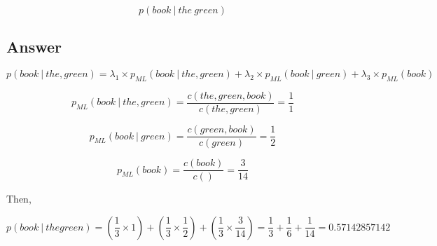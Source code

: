 \documentclass{article}
\newcommand\given[1][]{\:#1\vert\:}
\begin{document}
\begin{equation*}
p(book\given the\ green)
\end{equation*}

\subsection*{Answer}


\begin{equation*}
p(book \given the, green) = \lambda_1 \times p_{ML}(book \given the, green ) + \lambda_2 \times p_{ML}(book \given green) + \lambda_3 \times p_{ML}(book)
\end{equation*}

\begin{equation*}
 p_{ML}(book \given the, green ) = \frac{c(the, green, book)}{c(the, green)} = \frac{1}{1}
\end{equation*}

\begin{equation*}
 p_{ML}(book \given green ) = \frac{c(green, book)}{c(green)} = \frac{1}{2}
\end{equation*}

\begin{equation*}
 p_{ML}(book ) = \frac{c(book)}{c()} = \frac{3}{14}
\end{equation*}

Then,

\begin{equation*}
p(book \given the green) = (\frac{1}{3} \times 1) + (\frac{1}{3} \times \frac{1}{2}) + (\frac{1}{3} \times \frac{3}{14}) = \frac{1}{3} + \frac{1}{6} + \frac{1}{14} = 0.57142857142
\end{equation*}
\end{document}
